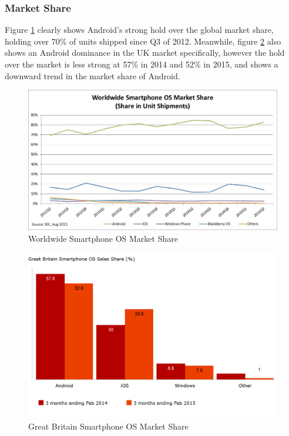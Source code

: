 \subsubsection{Market Share}
Figure \ref{fig:PhoneMarketShare} clearly shows Android's strong hold over the global market share, holding over 70\% of units shipped since Q3 of 2012. 
Meanwhile, figure \ref{fig:UKPhoneMarketShare} also shows an Android dominance in the UK market specifically, however the hold over the market is less strong at 57\% in 2014 and 52\% in 2015, and shows a downward trend in the market share of Android.

\begin{figure}[ht]
	\centering
	\includegraphics[scale=0.65]{images/phoneMarketShare.png}
	\caption{Worldwide Smartphone OS Market Share \citep{idcsmartphonereport}}
	\label{fig:PhoneMarketShare}
\end{figure}

\begin{figure}[ht]
	\centering
	\includegraphics[scale=0.25]{images/UKSmartphoneSales.png}
	\caption{Great Britain Smartphone OS Market Share \citep{kantargbsmartphonereport}}
	\label{fig:UKPhoneMarketShare}
\end{figure}

